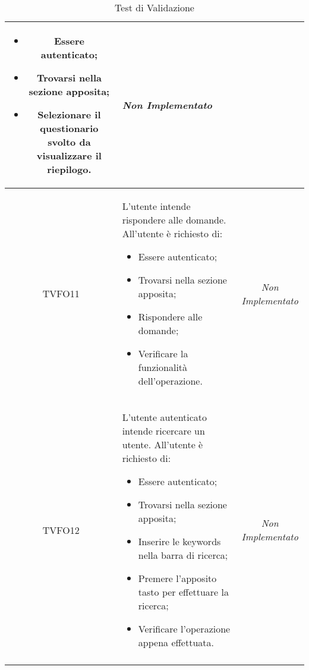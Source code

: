 \begin{longtable}[ht]{|c|>{}m{8cm}|c|}
\begin{itemize}
\item Essere autenticato;
\item Trovarsi nella sezione apposita;
\item Selezionare il questionario svolto da visualizzare il riepilogo. 
\end{itemize}
& \textit{Non Implementato}\\ \hline
\hypertarget{TVFO11}{TVFO11} & L’utente  intende rispondere alle domande. All’utente è richiesto di:
\begin{itemize}
\item Essere autenticato;
\item Trovarsi nella sezione apposita;
\item Rispondere alle domande;
\item Verificare la funzionalità dell'operazione.
\end{itemize}
 & \textit{Non Implementato}\\ \hline
\hypertarget{TVFO12}{TVFO12} & L’utente autenticato  intende ricercare un utente. All’utente è richiesto di:
\begin{itemize}
\item Essere autenticato;
\item Trovarsi nella sezione apposita;
\item Inserire le keywords nella barra di ricerca;
\item Premere l'apposito tasto per effettuare la ricerca;
\item Verificare l’operazione appena effettuata.
\end{itemize}
 & \textit{Non Implementato}\\ \hline
\caption[Test di Validazione]{Test di Validazione}
\label{tabella:test0}
\end{longtable}
\clearpage
